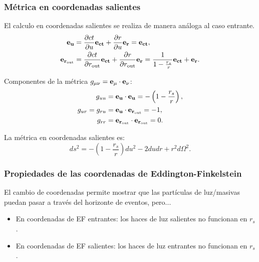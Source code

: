 \subsubsection{Métrica en coordenadas salientes}
El calculo en coordenadas salientes se realiza de manera análoga al caso entrante.
\begin{equation}
    \begin{aligned}
        \mathbf{e_u   }             & = \frac{\partial ct}{\partial u} \mathbf{e_{ct}} + \frac{\partial r}{\partial u} \mathbf{e_r} = \mathbf{e_{ct}},                                                             \\
        \mathbf{e_{r_{\text{out}}}} & = \frac{\partial ct}{\partial r_{\text{out}}} \mathbf{e_{ct}} + \frac{\partial r}{\partial r_{\text{out}}} \mathbf{e_r} = \frac{1}{1 - \frac{r_s}{r}} \mathbf{e_{ct}} + \mathbf{e_r}.
    \end{aligned}
\end{equation}

Componentes de la métrica \( g_{\mu\nu} = \mathbf{e_\mu} \cdot \mathbf{e_\nu} \):
\begin{equation}
    \begin{aligned}
        g_{uu}          & = \mathbf{e_u} \cdot \mathbf{e_u} = -\left(1 - \frac{r_s}{r}\right), \\
        g_{ur} = g_{ru} & = \mathbf{e_u} \cdot \mathbf{e_{r_{\text{out}}}} = -1,               \\
        g_{rr}          & = \mathbf{e_{r_{\text{out}}}} \cdot \mathbf{e_{r_{\text{out}}}} = 0.
    \end{aligned}
\end{equation}

La métrica en coordenadas salientes es:
\begin{equation}
    ds^2 = -\left(1 - \frac{r_s}{r}\right) du^2 - 2 du dr + r^2 d\Omega^2.
\end{equation}

\subsubsection{Propiedades de las coordenadas de Eddington-Finkelstein}
El cambio de coordenadas permite mostrar que las partículas de luz/masivas puedan pasar a través del horizonte de eventos, pero...
\begin{itemize}
    \item En coordenadas de EF entrantes: los haces de luz salientes no funcionan en $r_s$.
    \item En coordenadas de EF salientes: los haces de luz entrantes no funcionan en $r_s$.
\end{itemize}


